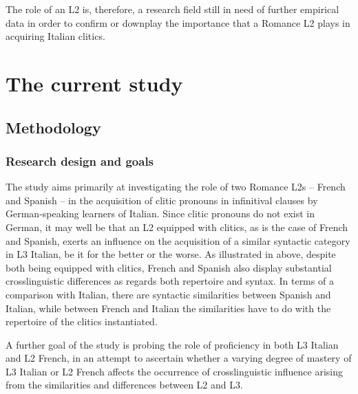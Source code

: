 \documentclass[output=paper,modfonts,nonflat,newtxmath]{langsci/langscibook}
\begin{document}
\z

The role of an L2 is, therefore, a research field still in need of further empirical data in order to confirm or downplay the importance that a Romance L2 plays in acquiring Italian clitics.

\section {The {current} study} %
\label{sec:sciutti:4}

\subsection{Methodology}%
\label{sec:sciutti:4.1}

\subsubsection{Research {design} {and} goals} %

The study aims primarily at investigating the role of two Romance L2s – French and Spanish – in the acquisition of clitic pronouns in infinitival clauses by Ger\-man-speaking learners of Italian. Since clitic pronouns do not exist in German, it may well be that an L2 equipped with clitics, as is the case of French and Spanish, exerts an influence on the acquisition of a similar syntactic category in L3 Italian, be it for the better or the worse. As illustrated in  above, despite both being equipped with clitics, French and Spanish also display substantial crosslinguistic differences as regards both repertoire and syntax. In terms of a comparison with Italian, there are syntactic similarities between Spanish and Italian, while between French and Italian the similarities have to do with the repertoire of the clitics instantiated.

A further goal of the study is probing the role of proficiency in both L3 Italian and L2 French, in an attempt to ascertain whether a varying degree of mastery of L3 Italian or L2 French affects the occurrence of crosslinguistic influence arising from the similarities and differences between L2 and L3.
\end{document}
